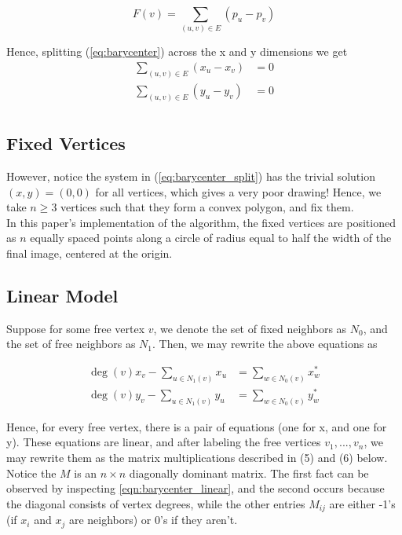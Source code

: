 \documentclass[11pt]{report}
\begin{document}
\begin{equation}\label{eq:barycenter}
F(v) = \sum_{(u, v) \in E} (p_u - p_v)
\end{equation}

Hence, splitting (\ref{eq:barycenter}) across the x and y dimensions we get
\begin{equation}\label{eq:barycenter_split}
    \begin{aligned}
    \sum_{(u, v) \in E} (x_u - x_v) &= 0 \\
    \sum_{(u, v) \in E} (y_u - y_v) &= 0 \\
    \end{aligned}
\end{equation}

\subsection{Fixed Vertices}
However, notice the system in (\ref{eq:barycenter_split}) has the trivial solution $(x, y) = (0, 0)$ for all vertices, which gives a very poor drawing! Hence, we take $n \geq 3$ vertices such that they form a convex polygon, and fix them. \\

In this paper's implementation of the algorithm, the fixed vertices are positioned as $n$ equally spaced points along a circle of radius equal to half the width of the final image, centered at the origin.

\subsection{Linear Model}
Suppose for some free vertex $v$, we denote the set of fixed neighbors as $N_0$, and the set of free neighbors as $N_1$. Then, we may rewrite the above equations as

\begin{equation}\label{eqn:barycenter_linear}
    \begin{aligned}
        \deg{(v)}x_v - \sum_{u \in N_1(v)} x_u &= \sum_{w \in N_0(v)} x^*_w \\
        \deg{(v)}y_v - \sum_{u \in N_1(v)} y_u &= \sum_{w \in N_0(v)} y^*_w
    \end{aligned}
\end{equation}

Hence, for every free vertex, there is a pair of equations (one for x, and one for y). These equations are linear, and after labeling the free vertices $v_1, ..., v_n$, we may rewrite them as the matrix multiplications described in (5) and (6) below. Notice the $M$ is an $n \times n$ diagonally dominant matrix. The first fact can be observed by inspecting \ref{eqn:barycenter_linear}, and the second occurs because the diagonal consists of vertex degrees, while the other entries $M_{ij}$ are either -1's (if $x_i$ and $x_j$ are neighbors) or 0's if they aren't.
\end{document}
